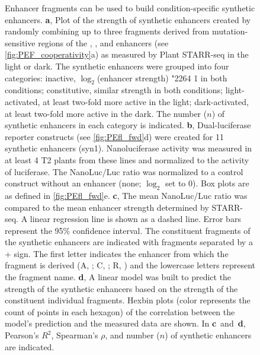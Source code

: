 \documentclass[10pt]{article}
\newcommand{\fignormal}{\footnotesize}
\renewcommand{\textle}{\char"2264{}}
\newcommand{\light}{light}
\newcommand{\dark}{dark}
\newif\ifnpc
\newcounter{fig}
\newenvironment{fig}{%
	\begin{figure}[p]%
		\stepcounter{fig}%
		\pdfbookmark{\figurename\ \thefig}{figure\thefig}
		\tikzsetnextfilename{figure\thefig}%
		\fignormal%
		\centering%
}{%
	\end{figure}%
	\clearpage%
	\ifnpc%
		\makenextpagecaption%
		\global\npcfalse%
	\fi%
}
\newif\ifsupp
\newcommand{\titleend}{. }
\newcommand{\nextentry}{ }
\newcommand{\captiontitle}[2][]{#2\titleend #1}
\newif\ifsubfigupper
\newcounter{subfig}[figure]
\newcommand{\subfigrefsep}{,}
\newcommand{\subfigrefand}{~and~}
\newcommand{\subfigunformatted}[1]{\ifsubfigupper\uppercase{#1}\else\lowercase{#1}\fi}
\newcommand{\plainsubfigref}[1]{\textbf{\subfigunformatted{#1}}}
\newcommand{\subfig}[1]{\plainsubfigref{#1}\subfigrefsep}
\begin{document}
		\begin{fig}
			\caption{%
				\captiontitle{Enhancer fragments can be used to build condition-specific synthetic enhancers}%
				\subfig{A} Plot of the strength of synthetic enhancers created by randomly combining up to three fragments derived from mutation-sensitive regions of the , , and  enhancers (see \cref{fig:PEF_cooperativity}\subfigunformatted{A}) as measured by Plant STARR-seq in the \light{} or \dark. The synthetic enhancers were grouped into four categories: inactive, $\log_2$(enhancer strength) \textle{} 1 in both conditions; constitutive, similar strength in both conditions;  light-activated, at least two-fold more active in the light; dark-activated, at least two-fold more active in the dark. The number ($n$) of synthetic enhancers in each category is indicated.\nextentry
				\subfig{B} Dual-luciferase reporter constructs (see \cref{fig:PEfl_fwd}\subfigunformatted{D}) were created for 11 synthetic enhancers (syn1). Nanoluciferase activity was measured in at least 4 T2 plants from these lines and normalized to the activity of luciferase. The NanoLuc/Luc ratio was normalized to a control construct without an enhancer (none; $\log_2$ set to 0). Box plots are as defined in \cref{fig:PEfl_fwd}\subfigunformatted{E}.
				\subfig{C} The mean NanoLuc/Luc ratio was compared to the mean enhancer strength determined by STARR-seq. A linear regression line is shown as a dashed line. Error bars represent the 95\% confidence interval. The constituent fragments of the synthetic enhancers are indicated with fragments separated by a + sign. The first letter indicates the  enhancer from which the fragment is derived (A, ; C, ; R, ) and the lowercase letters represent the fragment name.\nextentry
				\subfig{D} A linear model was built to predict the strength of the synthetic enhancers based on the strength of the constituent individual fragments. Hexbin plots (color represents the count of points in each hexagon) of the correlation between the model's prediction and the measured data are shown.\nextentry
				In \plainsubfigref{C}\subfigrefand\plainsubfigref{D}, Pearson's $R^2$, Spearman's $\rho$, and number ($n$) of synthetic enhancers are indicated.
			}%
			\label{fig:PEF_model}
		\end{fig}

	
	\fi
	
	\ifsupp
		
\end{document}
